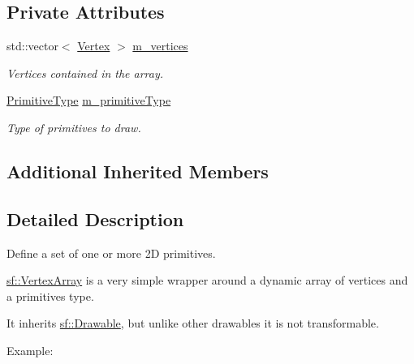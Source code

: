 \subsection*{Private Attributes}
\begin{DoxyCompactItemize}
\item 
\mbox{\label{classsf_1_1_vertex_array_a95a90bb68868a1548345651a3d9eae04}} 
std\+::vector$<$ \mbox{\hyperlink{classsf_1_1_vertex}{Vertex}} $>$ \mbox{\hyperlink{classsf_1_1_vertex_array_a95a90bb68868a1548345651a3d9eae04}{m\+\_\+vertices}}
\begin{DoxyCompactList}\small\item\em Vertices contained in the array. \end{DoxyCompactList}\item 
\mbox{\label{classsf_1_1_vertex_array_a5d1b94b429267b30301430b4974c5f48}} 
\mbox{\hyperlink{group__graphics_ga5ee56ac1339984909610713096283b1b}{Primitive\+Type}} \mbox{\hyperlink{classsf_1_1_vertex_array_a5d1b94b429267b30301430b4974c5f48}{m\+\_\+primitive\+Type}}
\begin{DoxyCompactList}\small\item\em Type of primitives to draw. \end{DoxyCompactList}\end{DoxyCompactItemize}
\subsection*{Additional Inherited Members}


\subsection{Detailed Description}
Define a set of one or more 2D primitives. 

\begin{DoxyVerb}\end{DoxyVerb}


\mbox{\hyperlink{classsf_1_1_vertex_array}{sf\+::\+Vertex\+Array}} is a very simple wrapper around a dynamic array of vertices and a primitives type.

It inherits \mbox{\hyperlink{classsf_1_1_drawable}{sf\+::\+Drawable}}, but unlike other drawables it is not transformable.

Example\+: 
\begin{DoxyCode}{0}
\DoxyCodeLine{}
\end{DoxyCode}


